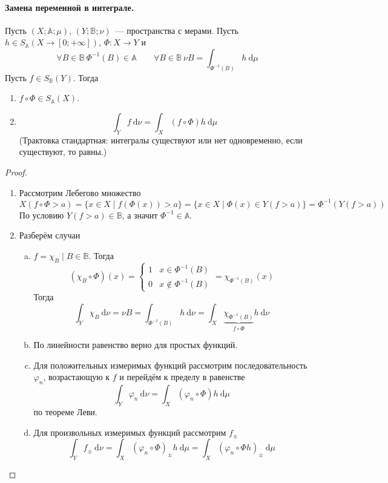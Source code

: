 \documentclass{article}
\let\tmp\varphi
\let\varphi\phi
\let\phi\tmp
\begin{document}
    \paragraph{Замена переменной в интеграле.}
    \begin{theorem}
        \label{Общая схема замены переменной в интеграле}
        Пусть $(X;\mathbb A;\mu)$, $(Y;\mathbb B;\nu)$~--- пространства с мерами. Пусть $h\in S_{\mathbb A}(X\to[0;+\infty])$, $\Phi\colon X\to Y$ и
        $$
        \forall B\in\mathbb B~\Phi^{-1}(B)\in\mathbb A\qquad \forall B\in\mathbb B~\nu B=\int_{\Phi^{-1}(B)}h~\mathrm d\mu
        $$
        Пусть $f\in S_{\mathbb B}(Y)$. Тогда
        \begin{enumerate}
            \item $f\circ\Phi\in S_{\mathbb A}(X)$.
            \item
            $$
            \int_Y f~\mathrm d\nu=\int_X(f\circ\Phi)h~\mathrm d\mu
            $$
            (Трактовка стандартная: интегралы существуют или нет одновременно, если существуют, то равны.)
        \end{enumerate}
    \end{theorem}
    \begin{proof}
        \begin{enumerate}
            \item Рассмотрим Лебегово множество
            $$
            X(f\circ\Phi>a)=\{x\in X\mid f(\Phi(x))>a\}=\{x\in X\mid \Phi(x)\in Y(f>a)\}=\Phi^{-1}(Y(f>a))
            $$
            По условию $Y(f>a)\in \mathbb B$, а значит $\Phi^{-1}\in\mathbb A$.
            \item Разберём случаи
            \begin{enumerate}[a.]
                \item $f=\chi_B\mid B\in\mathbb B$. Тогда
                $$
                (\chi_B\circ\Phi)(x)=\begin{cases}
                    1 & x\in\Phi^{-1}(B)\\0 & x\notin\Phi^{-1}(B)
                \end{cases}=\chi_{\Phi^{-1}(B)}(x)
                $$
                Тогда
                $$
                \int_{Y}\chi_B~\mathrm d\nu=\nu B=\int_{\Phi^{-1}(B)}h~\mathrm d\nu=\int_{X}\underbrace{\chi_{\Phi^{-1}(B)}}_{f\circ\Phi}h~\mathrm d\nu
                $$
                \item По линейности равенство верно для простых функций.
                \item Для положительных измеримых функций рассмотрим последовательность $\phi_n$, возрастающую к $f$ и перейдём к пределу в равенстве
                $$
                \int_Y\phi_n~\mathrm d\nu=\int_X(\phi_n\circ\Phi)h~\mathrm d\mu
                $$
                по теореме Леви.
                \item Для произвольных измеримых функций рассмотрим $f_{\pm}$
                $$
                \int_Yf_\pm~\mathrm d\nu=\int_X(\phi_n\circ\Phi)_\pm h~\mathrm d\mu=\int_X(\phi_n\circ\Phi h)_\pm~\mathrm d\mu
                $$
            \end{enumerate}
        \end{enumerate}
    \end{proof}
\end{document}
